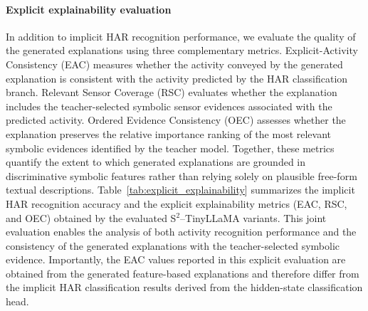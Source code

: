 \documentclass[preprint,12pt]{elsarticle}
\begin{document}
\paragraph{Explicit explainability evaluation}
In addition to implicit HAR recognition performance, we evaluate the quality of the generated explanations using three complementary metrics. Explicit-Activity Consistency (EAC) measures whether the activity conveyed by the generated explanation is consistent with the activity predicted by the HAR classification branch. Relevant Sensor Coverage (RSC) evaluates whether the explanation includes the teacher-selected symbolic sensor evidences associated with the predicted activity. Ordered Evidence Consistency (OEC) assesses whether the explanation preserves the relative importance ranking of the most relevant symbolic evidences identified by the teacher model. Together, these metrics quantify the extent to which generated explanations are grounded in discriminative symbolic features rather than relying solely on plausible free-form textual descriptions. Table~\ref{tab:explicit_explainability} summarizes the implicit HAR recognition accuracy and the explicit explainability metrics (EAC, RSC, and OEC) obtained by the evaluated S$^{2}$--TinyLLaMA variants. This joint evaluation enables the analysis of both activity recognition performance and the consistency of the generated explanations with the teacher-selected symbolic evidence. Importantly, the EAC values reported in this explicit evaluation are obtained from the generated feature-based explanations and therefore differ from the implicit HAR classification results derived from the hidden-state classification head.
\end{document}
